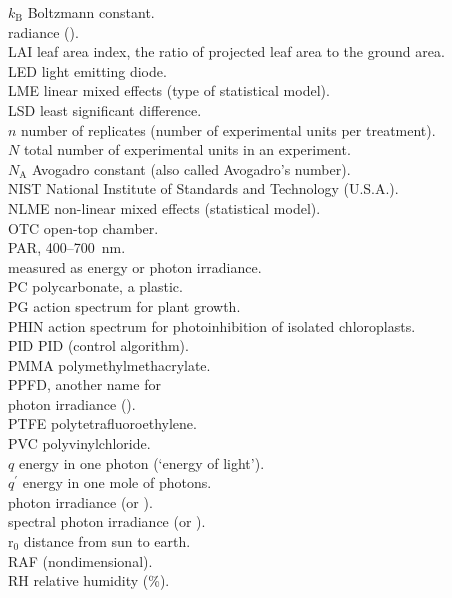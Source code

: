 \begin{tabbing}
$k_\mathrm{B}$ \> Boltzmann constant.\\
\rad   \> radiance (\wattsr).\\
LAI \> leaf area index, the ratio of projected leaf area to the ground area.\\
LED \> light emitting diode.\\
LME \> linear mixed effects (type of statistical model).\\
LSD \> least significant difference.\\
$n$ \> number of replicates (number of experimental units per treatment).\\
$N$ \> total number of experimental units in an experiment.\\
$N_\mathrm{A}$ \> Avogadro constant (also called Avogadro's number).\\
NIST \> National Institute of Standards and Technology (U.S.A.).\\
NLME \> non-linear mixed effects (statistical model).\\
OTC \> open-top chamber.\\
\PAR  \> \gls{PAR}, 400--700~nm.\\
      \> measured as energy or photon irradiance.\\
PC \> polycarbonate, a plastic.\\
PG \> \UV action spectrum for plant growth.\\
PHIN \> \UV action spectrum for photoinhibition of isolated chloroplasts.\\
PID \> \gls{PID} (control algorithm).\\
PMMA  \> polymethylmethacrylate.\\
\PPFD \> \gls{PPFD}, another name for\\
      \> \PAR photon irradiance (\pfd[PAR]).\\
PTFE  \> polytetrafluoroethylene.\\
PVC  \> polyvinylchloride.\\
$q$ \> energy in one photon (`energy of light').\\
$q^\prime$ \> energy in one mole of photons.\\
\pfd  \> photon irradiance (\molms or \umol).\\
\spfd \> spectral photon irradiance (\molnm or \umolnm).\\
r$_0$ \> distance from sun to earth.\\
\RAF \> \gls{RAF} (nondimensional).\\
RH \> relative humidity (\%).\\

\end{tabbing}
